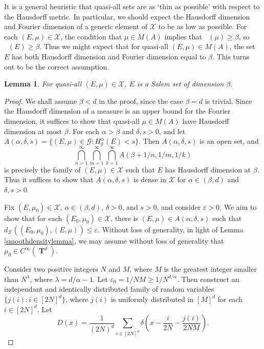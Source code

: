 \documentclass[12pt,reqno]{article}
\numberwithin{equation}{section}
\DeclareMathOperator{\hausdim}{\dim_{\mathbf{H}}}
\DeclareMathOperator{\fordim}{\dim_{\mathbf{F}}}
\DeclareMathOperator{\TT}{\mathbf{T}}
\newtheorem{lemma}[theorem]{Lemma}
\begin{document}
It is a general heuristic that quasi-all sets are as `thin as possible' with respect to the Hausdorff metric. In particular, we should expect the Hausdorff dimension and Fourier dimension of a generic element of $\mathcal{X}$ to be as low as possible. For each $(E,\mu) \in \mathcal{X}$, the condition that $\mu \in M(A)$ implies that $\fordim(\mu) \geq \beta$, so $\fordim(E) \geq \beta$. Thus we might expect that for quasi-all $(E,\mu) \in M(A)$, the set $E$ has both Hausdorff dimension and Fourier dimension equal to $\beta$. This turns out to be the correct assumption.

\begin{lemma}
    For quasi-all $(E,\mu) \in \mathcal{X}$, $E$ is a Salem set of dimension $\beta$.
\end{lemma}
\begin{proof}
    We shall assume $\beta < d$ in the proof, since the case $\beta = d$ is trivial. Since the Hausdorff dimension of a measure is an upper bound for the Fourier dimension, it suffices to show that quasi-all $\mu \in M(A)$ have Hausdorff dimension at most $\beta$. For each $\alpha > \beta$ and $\delta, s > 0$, and let $A(\alpha,\delta,s) = \{ (E,\mu) \in \mathcal{G}: H^\alpha_\delta(E) < s \}$. Then $A(\alpha,\delta,s)$ is an open set, and
    \[ \bigcap_{n = 1}^\infty \bigcap_{m = 1}^\infty \bigcap_{k = 1}^\infty A(\beta + 1/n, 1/m, 1/k) \]
    is precisely the family of $(E,\mu) \in \mathcal{X}$ such that $E$ has Hausdorff dimension at $\beta$.
%
    Thus it suffices to show that $A(\alpha,\delta,s)$ is dense in $\mathcal{X}$ for $\alpha \in (\beta,d)$ and $\delta, s > 0$.

    Fix $(E,\mu_0) \in \mathcal{X}$, $\alpha \in (\beta,d)$, $\delta > 0$, and $s > 0$, and consider $\varepsilon > 0$. We aim to show that for each $(E_0,\mu_0) \in \mathcal{X}$, there is $(E,\mu) \in A(\alpha,\delta,s)$ such that $d_{\mathcal{X}}((E_0,\mu_0),(E,\mu)) \leq \varepsilon$. Without loss of generality, in light of Lemma \ref{smoothdensitylemma}, we may assume without loss of generality that $\mu_0 \in C^\infty(\TT^d)$.

    Consider two positive integers $N$ and $M$, where $M$ is the greatest integer smaller than $N^\lambda$, where $\lambda = d/\alpha - 1$. Let $\varepsilon_0 = 1/NM \geq 1/N^{d/\alpha}$. Then construct an independant and identically distributed family of random variables $\{ j(i): i \in [2N]^d \}$, where $j(i)$ is uniformly distributed in $[M]^d$ for each $i \in [2N]^d$. Let
    \[ D(x) = \frac{1}{(2N)^d} \sum_{i \in [2N]^d} \delta \left( x - \frac{i}{2N} - \frac{j(i)}{2NM} \right). \]




\end{proof}
\end{document}
